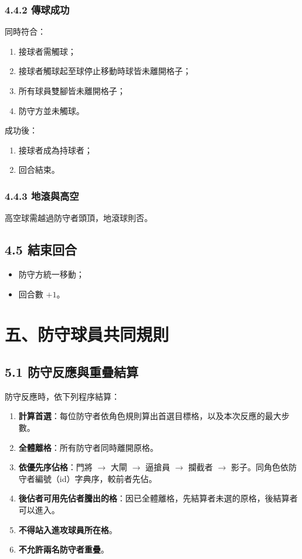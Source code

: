 \documentclass[11pt]{article}
\begin{document}
\subsubsection*{4.4.2 傳球成功}

同時符合：

\begin{enumerate}
  \item 接球者需觸球；
  \item 接球者觸球起至球停止移動時球皆未離開格子；
  \item 所有球員雙腳皆未離開格子；
  \item 防守方並未觸球。
\end{enumerate}

成功後：

\begin{enumerate}
  \item 接球者成為持球者；
  \item 回合結束。
\end{enumerate}

\subsubsection*{4.4.3 地滾與高空}

高空球需越過防守者頭頂，地滾球則否。

\subsection*{4.5 結束回合}

\begin{itemize}
  \item 防守方統一移動；
  \item 回合數 $+1$。
\end{itemize}

\section*{五、防守球員共同規則}

\subsection*{5.1 防守反應與重疊結算}

防守反應時，依下列程序結算：

\begin{enumerate}
  \item \textbf{計算首選}：每位防守者依角色規則算出首選目標格，以及本次反應的最大步數。
  \item \textbf{全體離格}：所有防守者同時離開原格。
  \item \textbf{依優先序佔格}：門將 $\rightarrow$ 大閘 $\rightarrow$ 逼搶員 $\rightarrow$ 攔截者 $\rightarrow$ 影子。同角色依防守者編號（id）字典序，較前者先佔。
  \item \textbf{後佔者可用先佔者騰出的格}：因已全體離格，先結算者未選的原格，後結算者可以進入。
  \item \textbf{不得站入進攻球員所在格}。
  \item \textbf{不允許兩名防守者重疊}。
\end{enumerate}
\end{document}
